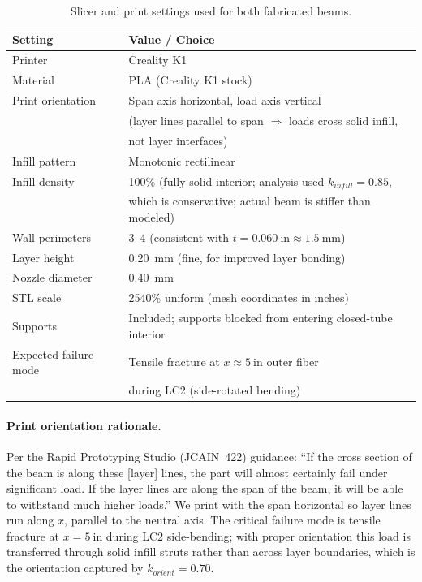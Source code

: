 \documentclass[11pt,letterpaper]{article}
\begin{document}
\begin{table}[H]
\centering
\caption{Slicer and print settings used for both fabricated beams.}
\label{tab:slicersettings}
\begin{tabular}{ll}
\toprule
Setting & Value / Choice \\
\midrule
Printer            & Creality K1 \\
Material           & PLA (Creality K1 stock) \\
Print orientation  & Span axis horizontal, load axis vertical \\
                   & (layer lines parallel to span $\Rightarrow$ loads cross solid infill, \\
                   & not layer interfaces) \\
Infill pattern     & Monotonic rectilinear \\
Infill density     & 100\% (fully solid interior; analysis used $k_{infill}=0.85$, \\
                   & which is conservative; actual beam is stiffer than modeled) \\
Wall perimeters    & 3--4 (consistent with $t = 0.060\ \mathrm{in} \approx 1.5\ \mathrm{mm}$) \\
Layer height       & \SI{0.20}{mm} (fine, for improved layer bonding) \\
Nozzle diameter    & \SI{0.40}{mm} \\
STL scale          & 2540\% uniform (mesh coordinates in inches) \\
Supports           & Included; supports blocked from entering closed-tube interior \\
Expected failure mode & Tensile fracture at $x \approx 5\ \mathrm{in}$ outer fiber \\
                   & during LC2 (side-rotated bending) \\
\bottomrule
\end{tabular}
\end{table}

\paragraph{Print orientation rationale.}
Per the Rapid Prototyping Studio (JCAIN~422) guidance: ``If the cross section
of the beam is along these [layer] lines, the part will almost certainly fail
under significant load.  If the layer lines are along the span of the beam,
it will be able to withstand much higher loads.''  We print with the span
horizontal so layer lines run along $x$, parallel to the neutral axis.
The critical failure mode is tensile fracture at $x = 5\ \mathrm{in}$ during
LC2 side-bending; with proper orientation this load is transferred through
solid infill struts rather than across layer boundaries, which is the
orientation captured by $k_{orient} = 0.70$.
\end{document}
